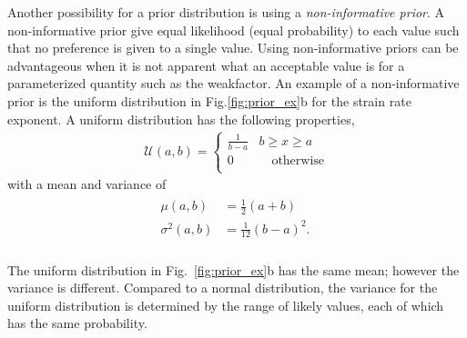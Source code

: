 \documentclass[12pt]{article}
\begin{document}
 Another possibility for a prior distribution is using a \textit{non-informative prior}\citep{Tarantola05}. A non-informative prior give equal likelihood (equal probability) to each value such that no preference is given to a single value. Using non-informative priors can be advantageous when it is not apparent what an acceptable value is for a parameterized quantity such as the weakfactor.  An example of a non-informative prior is the uniform distribution in Fig.\ref{fig:prior_ex}b for the strain rate exponent. A uniform distribution has the following properties,
\begin{align}
\mathcal{U}(a,b) =
\begin{cases}
 \frac{1}{b-a}   &b\geq x \geq a \\
               0 &\quad \text{otherwise} \\
\end{cases}
\end{align}
with a mean and variance of 
\begin{align}
\begin{split}
\mu(a,b) &=\frac{1}{2}(a+b) \\
\sigma^2(a,b) &=\frac{1}{12}(b-a)^2 .\ \\
\end{split}
\end{align}

The uniform distribution in Fig.~\ref{fig:prior_ex}b has the same mean; however the variance is different. Compared to a normal distribution, the variance for the uniform distribution is determined by the range of likely values, each of which has the same probability.
\end{document}
